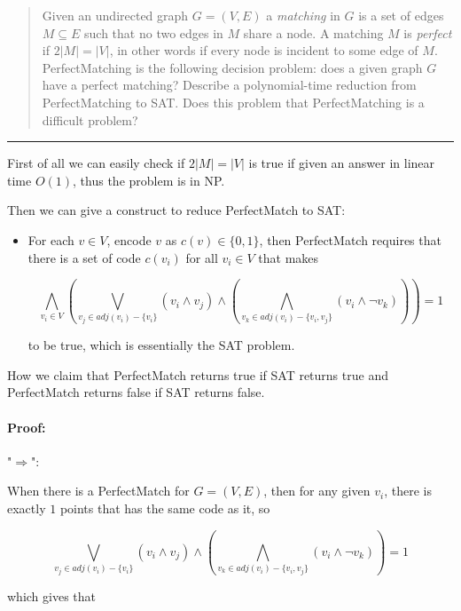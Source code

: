 \documentclass[11pt]{article}
\begin{document}



\begin{quote}
	Given an undirected graph $G=(V,E)$ a {\em matching} in $G$ is
  a set of edges $M \subseteq E$ such that no two edges in $M$ share
  a node. A matching $M$ is {\em perfect} if $2|M| = |V|$, in other words
  if every node is incident to some edge of $M$. PerfectMatching is
  the following decision problem: does a given graph $G$ have a perfect
  matching? Describe a polynomial-time reduction from PerfectMatching to
  SAT. Does this problem that PerfectMatching is a difficult problem?
\end{quote}
\hrule

\begin{solution}
	First of all we can easily check if $2|M| = |V|$ is true if given an answer in linear time $O(1)$, thus the problem is in NP.
	
	Then we can give a construct to reduce PerfectMatch to SAT:
	
	\begin{itemize}
		\item For each $v \in V$, encode $v$ as $c(v) \in \{0, 1\}$, then PerfectMatch requires that there is a set of code $c(v_i)$ for all $v_i \in V$ that makes
		
		\[\bigwedge_{v_i \in V} (\bigvee_{v_j \in adj(v_i) - \{v_i\}} (v_i \wedge v_j) \wedge (\bigwedge_{v_k \in adj(v_i) - \{v_i, v_j\}} (v_i \wedge \neg v_k) )) = 1\]
		
		to be true, which is essentially the SAT problem.
	\end{itemize}
	
	How we claim that PerfectMatch returns true if SAT returns true and PerfectMatch returns false if SAT returns false.
	
	\paragraph{Proof:}
	"$\Rightarrow$":
	
	When there is a PerfectMatch for $G = (V, E)$, then for any given $v_i$, there is exactly $1$ points that has the same code as it, so
		
		\[\bigvee_{v_j \in adj(v_i) - \{v_i\}} (v_i \wedge v_j) \wedge (\bigwedge_{v_k \in adj(v_i) - \{v_i, v_j\}} (v_i \wedge \neg v_k) ) = 1\]
		
		which gives that 
		

\end{solution}
\end{document}
